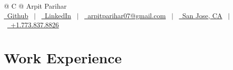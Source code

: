 \documentclass[a4paper,10pt]{article}
\begin{document}
\pagestyle{empty} 



\begin{tabularx}{\linewidth}{@{} C @{}}
\Huge{Arpit Parihar} \\[5pt]
\href{https://github.com/arpitp07}{\raisebox{-0.05\height}\faGithub\ Github} \ $|$ \ 
\href{https://linkedin.com/in/asp07}{\raisebox{-0.05\height}\faLinkedin\ LinkedIn} \ $|$ \ 
\href{mailto:arpitparihar07@gmail.com}{\raisebox{-0.05\height}\faEnvelope \ arpitparihar07@gmail.com} \ $|$ \ 
\href{https://www.google.com/maps/place/San+Jose,+CA/}{\raisebox{-0.05\height}\faMapMarker\ San Jose, CA} \ $|$ \ 
\href{tel:+17738378826}{\raisebox{-0.05\height}\faMobile \ +1.773.837.8826} \\
\end{tabularx}


\section{Work Experience}
\end{document}

